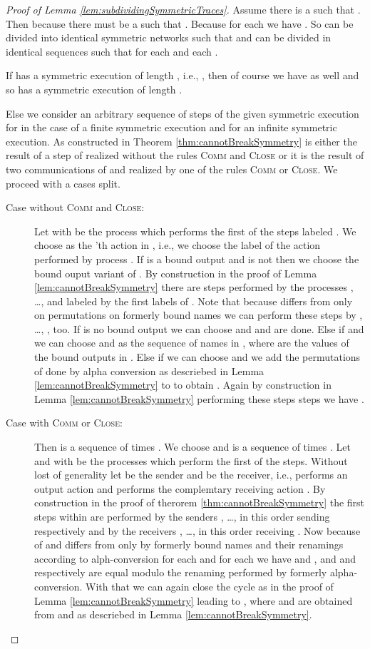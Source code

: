 \documentclass[11pt,techReport]{eptcs}
\begin{document}
\begin{proof}[Proof of Lemma \ref{lem:subdividingSymmetricTraces}]
	Assume there is a  such that . Then because  there must be a  such that . Because  for each  we have . So  can be divided into  identical symmetric networks such that  and  can be divided in  identical sequences such that  for each  and each .
	
	If  has a symmetric execution of length , i.e., , then of course we have  as well and so  has a symmetric execution of length .
	
	Else we consider an arbitrary sequence of  steps  of the given symmetric execution for  in the case of a finite symmetric execution and  for an infinite symmetric execution. As constructed in Theorem \ref{thm:cannotBreakSymmetry}  is either the result of a step of  realized without the rules \textsc{Comm} and \textsc{Close} or it is the result of two communications of  and  realized by one of the rules \textsc{Comm} or \textsc{Close}. We proceed with a cases split.
	\begin{description}
		\item[Case without \textsc{Comm} and \textsc{Close}:] Let  with  be the process which performs the first of the  steps labeled . We choose  as the 'th action in , i.e., we choose the label of the action performed by process . If  is a bound output and  is not then we choose the bound ouput variant of . By construction in the proof of Lemma \ref{lem:cannotBreakSymmetry} there are  steps performed by the processes , \ldots,  and labeled by the first  labels of . Note that because  differs from  only on permutations on formerly bound names we can perform these steps by , \ldots, , too. If  is no bound output we can choose  and  and are done. Else if  and  we can choose  and  as the sequence of names in , where  are the values of the bound outputs in . Else if  we can choose  and we add the permutations of  done by alpha conversion as descriebed in Lemma \ref{lem:cannotBreakSymmetry} to  to obtain . Again by construction in Lemma \ref{lem:cannotBreakSymmetry} performing these  steps steps we have .
		\item[Case with \textsc{Comm} or \textsc{Close}:] Then  is a sequence of  times . We choose  and  is a sequence of  times . Let  and  with  be the processes which perform the first of the  steps. Without lost of generality let  be the sender and  be the receiver, i.e.,  performs an output action  and  performs the complemtary receiving action . By construction in the proof of therorem \ref{thm:cannotBreakSymmetry} the first  steps within  are performed by the senders , \ldots,  in this order sending  respectively and by the receivers , \ldots,  in this order receiving . Now because of  and  differs from  only by formerly bound names and their renamings according to alph-conversion for each  and for each \linebreak  we have  and , and  and  respectively are equal modulo the renaming performed by formerly alpha-conversion. With that we can again close the cycle as in the proof of Lemma \ref{lem:cannotBreakSymmetry} leading to , where  and  are obtained from  and  as descriebed in Lemma \ref{lem:cannotBreakSymmetry}.

\end{description}
\end{proof}
\end{document}
